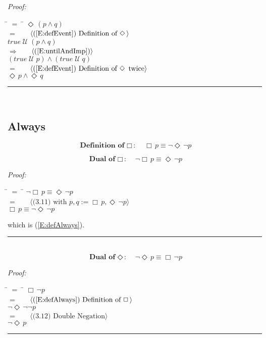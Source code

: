 \documentclass[fleqn, leqno]{article}
\newcommand{\lgap}{2pt} %
\newcommand{\mymathindent}{24pt} %
\newcommand{\Until}{\;\mathcal{U}\;}
\newcommand{\Event}{\Diamond\,}
\newcommand{\Always}{\Box\,}
\newcommand{\myqed}{\hfill\rule[-.23ex]{1.2ex}{2.0ex}}
\newcommand{\Gll} {\langle} %
\newcommand{\Ggg} {\rangle} %
\newcommand{\Hint}[1] {\ \ \ $\Gll \mbox{#1} \Ggg$ } %
\begin{document}
\emph{Proof:}
\begin{tabbing}
\hspace{\mymathindent} \= $= \;$ \= \kill
\> \> $\Event(p \land q)$\\[\lgap]
\> $=$ \> \Hint{(\ref{E:defEvent}) Definition of $\Event$}\\[\lgap]
\> \> $true \Until (p \land q)$\\[\lgap]
\> $\Rightarrow$ \> \Hint{(\ref{E:untilAndImp})}\\[\lgap]
\> \> $(true \Until p) \land (true \Until q)$\\[\lgap]
\> $=$ \> \Hint{(\ref{E:defEvent}) Definition of $\Event$ twice}\\[\lgap]
\> \> $\Event p \land \Event q$\\[\lgap]
\end{tabbing}
\myqed\\[\lgap]

\subsection{Always}

\begin{equation}\label{E:defAlways}
\textbf{Definition of $\Always$:}\quad \Always p \equiv \lnot\Event\lnot p
\end{equation}


\begin{equation}\label{E:dualAlways}
\textbf{Dual of $\Always$:}\quad \lnot\Always p \equiv \Event\lnot p
\end{equation}

\emph{Proof:}
\begin{tabbing}
\hspace{\mymathindent} \= $= \;$ \= \kill
\> \> $\lnot\Always p \equiv \Event\lnot p$\\[\lgap]
\> $=$ \> \Hint{(3.11) with $p,q := \Always p, \Event\lnot p$}\\[\lgap]
\> \> $\Always p \equiv \lnot\Event\lnot p$
\end{tabbing}
which is (\ref{E:defAlways}). \myqed\\[\lgap]


\begin{equation}\label{E:dualEvent}
\textbf{Dual of $\Event$:}\quad \lnot\Event p \equiv \Always\lnot p
\end{equation}

\emph{Proof:}
\begin{tabbing}
\hspace{\mymathindent} \= $= \;$ \= \kill
\> \> $\Always\lnot p$\\[\lgap]
\> $=$ \> \Hint{(\ref{E:defAlways}) Definition of $\Always$}\\[\lgap]
\> \> $\lnot\Event\lnot\lnot p$\\[\lgap]
\> $=$ \> \Hint{(3.12) Double Negation}\\[\lgap]
\> \> $\lnot\Event p$\\[\lgap]
\end{tabbing}
\myqed\\[\lgap]
\end{document}
